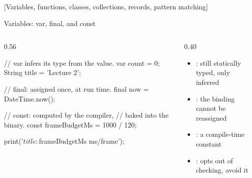 \documentclass[10pt,aspectratio=169,t]{beamer}
\begin{document}
[Variables, functions, classes, collections, records, pattern matching]

\begin{frame}[fragile,eyebrow=Dart]{Variables: var, final, and const}
  \begin{columns}[T]
    \begin{column}{0.56\textwidth}
\begin{dart}
// var infers its type from the value.
var count = 0;
String title = 'Lecture 2';

// final: assigned once, at run time.
final now = DateTime.now();

// const: computed by the compiler,
// baked into the binary.
const frameBudgetMs = 1000 / 120;

print('$title: $frameBudgetMs ms/frame');
\end{dart}
    \end{column}
    \begin{column}{0.40\textwidth}
      \begin{itemize}
        \item {}: still statically typed, only inferred
        \item {}: the binding cannot be reassigned
        \item {}: a compile-time constant
        \item {}: opts out of checking, avoid it
      \end{itemize}
    \end{column}
  \end{columns}
\end{frame}
\end{document}

